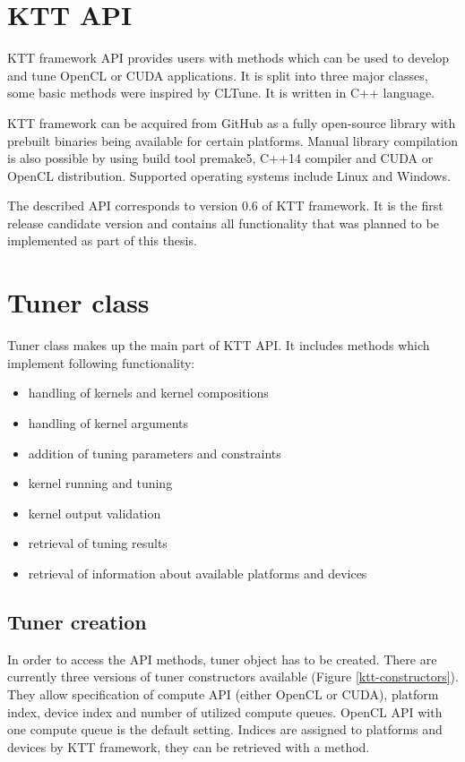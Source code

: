 \documentclass
[
    digital, %
    oneside, %
    table, %
    nolof, %
    nolot, %
    nocover %
]{fithesis3}
\begin{document}
\section{KTT API}
KTT framework API provides users with methods which can be used to develop and tune OpenCL or CUDA applications. It is split into three major
classes, some basic methods were inspired by CLTune. It is written in C++ language.

KTT framework can be acquired from GitHub as a fully open-source library with prebuilt binaries being available for certain platforms. Manual library
compilation is also possible by using build tool premake5, C++14 compiler and CUDA or OpenCL distribution. Supported operating systems include Linux
and Windows.

The described API corresponds to version 0.6 of KTT framework. It is the first release candidate version and contains all functionality that was
planned to be implemented as part of this thesis.

\section{Tuner class}
Tuner class makes up the main part of KTT API. It includes methods which implement following functionality:
\begin{itemize}
    \item handling of kernels and kernel compositions
    \item handling of kernel arguments
    \item addition of tuning parameters and constraints
    \item kernel running and tuning
    \item kernel output validation
    \item retrieval of tuning results
    \item retrieval of information about available platforms and devices
\end{itemize}

\subsection{Tuner creation}
In order to access the API methods, tuner object has to be created. There are currently three versions of tuner constructors available (Figure 
\ref{ktt-constructors}). They allow specification of compute API (either OpenCL or CUDA), platform index, device index and number of utilized compute
queues. OpenCL API with one compute queue is the default setting. Indices are assigned to platforms and devices by KTT framework, they can be retrieved
with a method.
\end{document}
